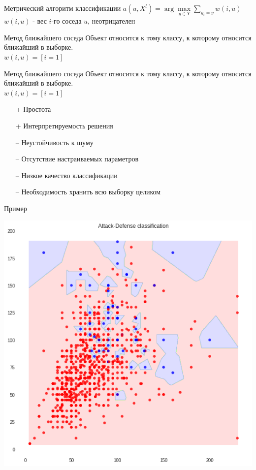 \documentclass[10pt]{beamer}
\begin{document}
\begin{frame}{Метрический алгоритм классификации}
	${a(u, X^l) = \arg\max\limits_{y \in Y} \sum\limits_{y_i = y} w(i, u)}$\\
	\vspace{5mm}
	$w(i, u)$ - вес $i$-го соседа $u$, неотрицателен\\
\end{frame}

\begin{frame}{Метод ближайшего соседа}
	Объект относится к тому классу, к которому относится ближайший в выборке.\\
	\bigbreak
	${w(i, u) = [i=1]}$\\
\end{frame}

\begin{frame}{Метод ближайшего соседа}
	Объект относится к тому классу, к которому относится ближайший в выборке.\\
	${w(i, u) = [i=1]}$\\
	\bigbreak
	\begin{itemize} [<+- | alert@+>]
		\item[+] Простота
		\item[+] Интерпретируемость решения
	  \bigbreak
		\item[--	] Неустойчивость к шуму
		\item[--	] Отсутствие настраиваемых параметров
		\item[--	] Низкое качество классификации
		\item[--	] Необходимость хранить всю выборку целиком		
	\end{itemize}
\end{frame}

\begin{frame}{Пример}
  \begin{center}
    	\includegraphics[width=\linewidth,height=0.8\textheight,keepaspectratio]{images/attack_vs_defense_fail}  
  \end{center}
\end{frame}
\end{document}
